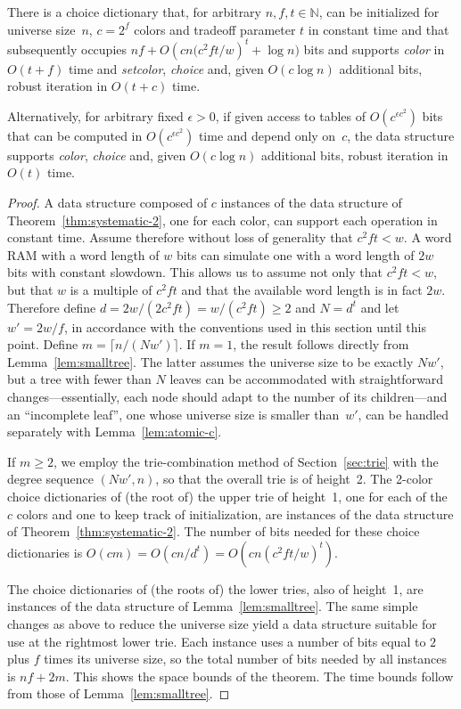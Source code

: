 \documentclass[envcountsame,envcountsect,undated,nolinenumbers]{lnthi}
\def\Tvn#1{\hbox{\textit{#1\/}}}
\def\Tceil#1{\lceil #1\rceil}
\def\TbbbN{\mathbb{N}}
\begin{document}
\begin{lemma}
\label{lem:unsystematic-tf}There is a choice dictionary that, for
arbitrary $n,f,t\in\TbbbN$,
can be initialized for universe size~$n$,
$c=2^f$ colors and tradeoff parameter $t$
in constant time and that subsequently occupies
$n f+O({{c n(c^2 f t}/w})^t+\log n)$ bits
and supports \Tvn{color} in $O(t+f)$ time and
\Tvn{setcolor},
\Tvn{choice} and, given $O(c\log n)$ additional bits,
robust iteration in $O(t+c)$ time.

Alternatively, for arbitrary fixed $\epsilon>0$,
if given access to tables of
$O(c^{\epsilon c^2})$ bits that can be computed in
$O(c^{\epsilon c^2})$ time and
depend only on~$c$, the data structure supports
\Tvn{color}, \Tvn{choice} and,
given $O(c\log n)$ additional bits,
robust iteration
in $O(t)$ time.
\end{lemma}

\begin{proof}
A data structure composed of $c$ instances of
the data structure of Theorem~\ref{thm:systematic-2},
one for each color, can support each
operation in constant time.
Assume therefore without loss of generality that
$c^2 f t<w$.
A word RAM with a word length of $w$ bits
can simulate one with a word length of $2 w$ bits
with constant slowdown.
This allows us to assume not only that
$c^2 f t<w$, but that $w$ is a multiple of $c^2 f t$
and that
the available
word length is in fact $2 w$.
Therefore define
$d={{2 w}/{(2 c^2 f t)}}={w/{(c^2 f t)}}\ge 2$ and $N=d^t$
and let $w'={{2 w}/f}$, in accordance
with the conventions used in this
section until this point.
Define $m=\Tceil{{n/{(N w')}}}$.
If $m=1$, the result follows directly from
Lemma~\ref{lem:smalltree}.
The latter assumes the universe size to be
exactly $N w'$, but a tree with fewer than
$N$ leaves
can be accommodated with straightforward
changes---essentially, each node should
adapt to
the number of its children---and
an ``incomplete leaf'',
one whose universe size is smaller than~$w'$,
can be handled separately with
Lemma~\ref{lem:atomic-c}.

If $m\ge 2$, we employ the trie-combination method of
Section~\ref{sec:trie} with
the degree sequence $(N w',n)$,
so that the overall trie is of height~2.
The 2-color choice dictionaries
of (the root of) the upper trie of height~1,
one for each of the $c$ colors and one
to keep track of initialization, are
instances of the data structure of
Theorem~\ref{thm:systematic-2}.
The number of bits needed
for these choice dictionaries is
$O(c m)=O(c n/{d^t})
=O(c n({{c^2 f t}/w})^t)$.

The choice dictionaries of (the roots of) the
lower tries, also of height~1,
are instances of the data
structure of Lemma~\ref{lem:smalltree}.
The same simple changes as above to reduce the
universe size yield a data structure
suitable for use at the rightmost lower trie.
Each instance uses 
a number of bits equal to $2$ plus
$f$ times its universe size, so the total
number of bits needed by all instances is $n f+2 m$.
This shows the space bounds of the theorem.
The time bounds follow from those of
Lemma~\ref{lem:smalltree}.
\end{proof}
\end{document}
